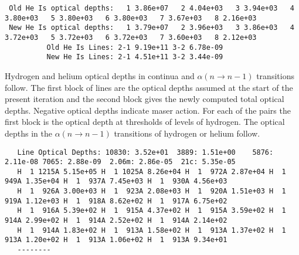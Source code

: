 {\begin{verbatim}
 Old He Is optical depths:   1 3.86e+07   2 4.04e+03   3 3.94e+03   4 3.80e+03   5 3.80e+03   6 3.80e+03   7 3.67e+03   8 2.16e+03
 New He Is optical depths:   1 3.79e+07   2 3.96e+03   3 3.86e+03   4 3.72e+03   5 3.72e+03   6 3.72e+03   7 3.60e+03   8 2.12e+03
          Old He Is Lines: 2-1 9.19e+11 3-2 6.78e-09
          New He Is Lines: 2-1 4.51e+11 3-2 3.44e-09
\end{verbatim}
}

Hydrogen and helium optical depths in continua and
$\alpha(n \to n-1)$ transitions follow.
The first block of lines are the optical depths assumed at the
start of the present iteration and the second block gives the newly computed
total optical depths.
Negative optical depths indicate maser action.
For
each of the pairs the first block is the optical depth at thresholds of
levels of hydrogen.
The optical depths in the $\alpha(n \to n-1)$ transitions of
hydrogen or helium follow.
{\setverbatimfontsize{\tiny}
\begin{verbatim}
   Line Optical Depths: 10830: 3.52e+01  3889: 1.51e+00    5876: 2.11e-08 7065: 2.88e-09  2.06m: 2.86e-05  21c: 5.35e-05
   H  1 1215A 5.15e+05 H  1 1025A 8.26e+04 H  1  972A 2.87e+04 H  1  949A 1.35e+04 H  1  937A 7.45e+03 H  1  930A 4.56e+03
   H  1  926A 3.00e+03 H  1  923A 2.08e+03 H  1  920A 1.51e+03 H  1  919A 1.12e+03 H  1  918A 8.62e+02 H  1  917A 6.75e+02
   H  1  916A 5.39e+02 H  1  915A 4.37e+02 H  1  915A 3.59e+02 H  1  914A 2.99e+02 H  1  914A 2.52e+02 H  1  914A 2.14e+02
   H  1  914A 1.83e+02 H  1  913A 1.58e+02 H  1  913A 1.37e+02 H  1  913A 1.20e+02 H  1  913A 1.06e+02 H  1  913A 9.34e+01
   --------
 \end{verbatim}
}

